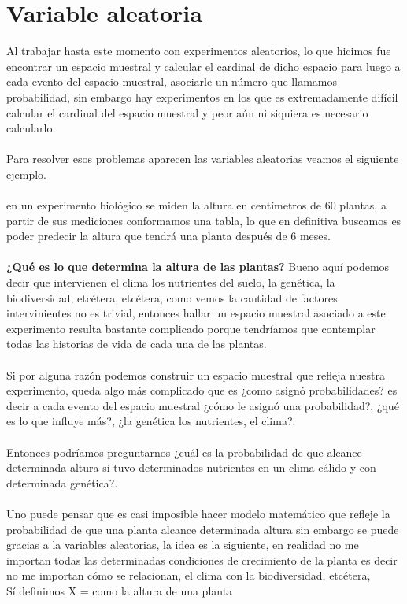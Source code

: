 \documentclass[12pt]{book}
\begin{document}
\chapter{Variable aleatoria}
Al trabajar hasta este momento con experimentos aleatorios, lo que hicimos fue encontrar un espacio muestral y calcular el cardinal de dicho espacio para luego a cada evento del espacio muestral, asociarle un número que llamamos probabilidad, sin embargo hay experimentos en los que es extremadamente difícil calcular el cardinal del espacio muestral y peor aún ni siquiera es necesario calcularlo. \\
\\
Para resolver esos problemas aparecen las variables aleatorias veamos el siguiente ejemplo.
\\ \\
en un experimento biológico se miden la altura en centímetros de 60 plantas, a partir de sus mediciones conformamos una tabla, lo que en definitiva buscamos es poder predecir la altura que tendrá una planta después de 6 meses.
\\ \\
\textbf{¿Qué es lo que determina la altura de las plantas?}
Bueno aquí podemos decir que intervienen el clima los nutrientes del suelo, la genética, la biodiversidad, etcétera, etcétera, 
como vemos la cantidad de factores intervinientes no es trivial, entonces hallar un espacio muestral asociado a este experimento resulta bastante complicado porque tendríamos que contemplar todas las historias de vida de cada una de las plantas.
\\ \\
Si por alguna razón podemos construir un espacio muestral que refleja nuestra experimento, queda algo más complicado que es ¿como asignó probabilidades? es decir a cada evento del espacio muestral ¿cómo le asignó una probabilidad?, ¿qué es lo que influye más?, ¿la genética los nutrientes, el clima?.
\\ \\
Entonces podríamos preguntarnos ¿cuál es la probabilidad de que alcance determinada altura si tuvo determinados nutrientes en un clima cálido y con determinada genética?.
\\ \\
Uno puede pensar que es casi imposible hacer modelo matemático que refleje la probabilidad de que una planta alcance determinada altura sin embargo se puede gracias a la variables aleatorias, la idea es la siguiente, en realidad no me importan todas las determinadas condiciones de crecimiento de la planta es decir no me importan cómo se relacionan, el clima con la biodiversidad, etcétera,
\\
Sí definimos X = como la altura de una planta \\ \\
\end{document}
